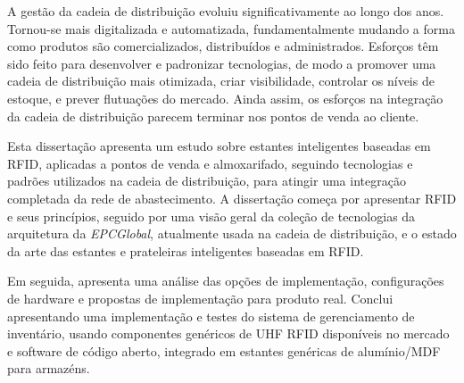 A gestão da cadeia de distribuição evoluiu significativamente ao longo dos anos. Tornou-se mais digitalizada e automatizada, fundamentalmente mudando a forma como produtos são comercializados, distribuídos e administrados. Esforços têm sido feito para desenvolver e padronizar tecnologias, de modo a promover uma cadeia de distribuição mais otimizada, criar visibilidade,  controlar os níveis de estoque, e prever flutuações do mercado.
Ainda assim, os esforços na integração da cadeia de distribuição parecem terminar nos pontos de venda ao cliente.

Esta dissertação apresenta um estudo sobre estantes inteligentes baseadas em RFID, aplicadas a pontos de venda e almoxarifado, seguindo tecnologias e padrões utilizados na cadeia de distribuição, para atingir uma integração completada da rede de abastecimento.
A dissertação começa por apresentar RFID e seus princípios, seguido por uma visão geral da coleção de tecnologias da arquitetura da \emph{EPCGlobal}, atualmente usada na cadeia de distribuição, e o estado da arte das estantes e prateleiras inteligentes baseadas em RFID.

Em seguida, apresenta uma análise das opções de implementação, configurações de hardware e propostas de implementação para produto real.
Conclui apresentando uma implementação e testes do sistema de gerenciamento de inventário, usando componentes genéricos de UHF RFID disponíveis no mercado e software de código aberto, integrado em estantes genéricas de alumínio/MDF para armazéns.
